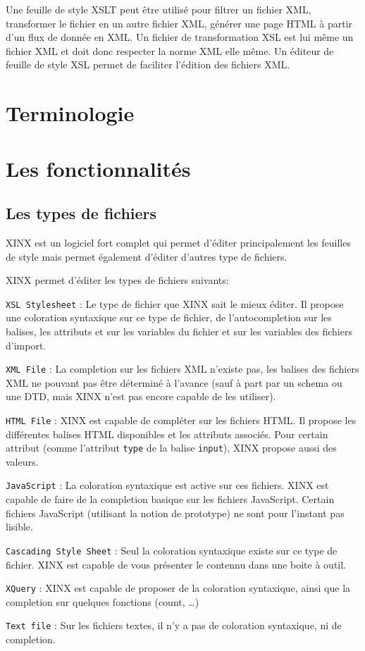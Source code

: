 \documentclass[a4paper,10pt,twoside]{book}
\begin{document}
Une feuille de style XSLT peut être utilisé pour filtrer un fichier XML, transformer le fichier en un autre fichier XML, générer une page HTML à partir d'un flux de donnée en XML. Un fichier de transformation XSL est lui même un fichier XML et doit donc respecter la norme XML elle même. Un éditeur de feuille de style XSL permet de faciliter l'édition des fichiers XML.

\section{Terminologie}

\section{Les fonctionnalités}

\subsection{Les types de fichiers}

XINX est un logiciel fort complet qui permet d'éditer principalement les feuilles de style mais permet également d'éditer d'autres type de fichiers.

XINX permet d'éditer les types de fichiers suivants:
\begin{itemsize}
  \item \verb+XSL Stylesheet+ : Le type de fichier que XINX sait le mieux éditer. Il propose une coloration syntaxique sur ce type de fichier, de l'autocompletion sur les balises, les attributs et sur les variables du fichier et sur les variables des fichiers d'import.
  \item \verb+XML File+ : La completion sur les fichiers XML n'existe pas, les balises des fichiers XML ne pouvant pas être déterminé à l'avance (sauf à part par un schema ou une DTD, mais XINX n'est pas encore capable de les utiliser). 
  \item \verb+HTML File+ : XINX est capable de compléter sur les fichiers HTML. Il propose les différentes balises HTML disponibles et les attributs associés. Pour certain attribut (comme l'attribut \verb+type+ de la balise \verb+input+), XINX propose aussi des valeurs.
  \item \verb+JavaScript+ : La coloration syntaxique est active sur ces fichiers. XINX est capable de faire de la completion basique sur les fichiers JavaScript. Certain fichiers JavaScript (utilisant la notion de prototype) ne sont pour l'instant pas lisible.
  \item \verb+Cascading Style Sheet+ : Seul la coloration syntaxique existe sur ce type de fichier. XINX est capable de vous présenter le contennu dans une boite à outil.
  \item \verb+XQuery+ : XINX est capable de proposer de la coloration syntaxique, ainsi que la completion sur quelques fonctions (count, \dots)
  \item \verb+Text file+ : Sur les fichiers textes, il n'y a pas de coloration syntaxique, ni de completion.
\end{itemsize}
\end{document}
